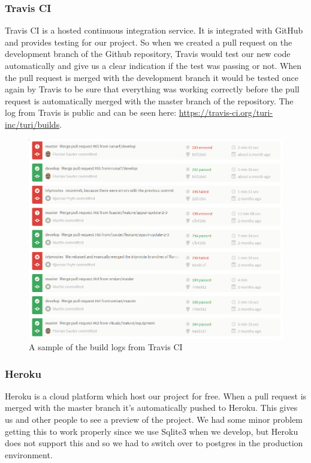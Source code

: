 \documentclass[a4paper]{article}
\begin{document}
\subsubsection{Travis CI}
Travis CI is a hosted continuous integration service. It is integrated with GitHub and provides testing for our project. So when we created a pull request on the development branch of the Github repository, Travis would test our new code automatically and give us a clear indication if the test was passing or not. When the pull request is merged with the development branch it would be tested once again by Travis to be sure that everything was working correctly before the pull request is automatically merged with the master branch of the repository. The log from Travis is public and can be seen here: \url{https://travis-ci.org/turi-inc/turi/builds}.

\begin{figure}
  \begin{center}
    \includegraphics[scale=0.45]{pictures/Travis_buildlog.png}
    \caption{A sample of the build logs from Travis CI}
    \label{fig:}
  \end{center}
\end{figure}


\subsubsection{Heroku}
Heroku is a cloud platform which host our project for free. When a pull request is merged with the master branch it's automatically pushed to Heroku. This gives us and other people to see a preview of the project. We had some minor problem getting this to work properly since we use Sqlite3 when we develop, but Heroku does not support this and so we had to switch over to postgres in the production environment.
\end{document}
